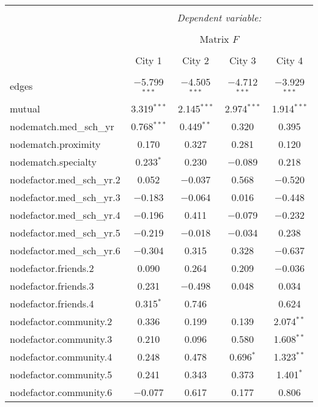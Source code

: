 \documentclass[11pt]{article}
\begin{document}
\begin{table}[!htbp] \centering 
  \caption{} 
  \label{} 
\begin{tabular}{@{\extracolsep{5pt}}lcccc} 
\\[-1.8ex]\hline 
\hline \\[-1.8ex] 
 & \multicolumn{4}{c}{\textit{Dependent variable:}} \\ 
\cline{2-5} 
\\[-1.8ex] & \multicolumn{4}{c}{Matrix $F$} \\ 
\\[-1.8ex] & City 1 & City 2 & City 3 & City 4\\ 
\hline \\[-1.8ex] 
 edges & $-$5.799$^{***}$ & $-$4.505$^{***}$ & $-$4.712$^{***}$ & $-$3.929$^{***}$ \\ 
  mutual & 3.319$^{***}$ & 2.145$^{***}$ & 2.974$^{***}$ & 1.914$^{***}$ \\ 
  nodematch.med\_sch\_yr & 0.768$^{***}$ & 0.449$^{**}$ & 0.320 & 0.395 \\ 
  nodematch.proximity & 0.170 & 0.327 & 0.281 & 0.120 \\ 
  nodematch.specialty & 0.233$^{*}$ & 0.230 & $-$0.089 & 0.218 \\ 
  nodefactor.med\_sch\_yr.2 & 0.052 & $-$0.037 & 0.568 & $-$0.520 \\ 
  nodefactor.med\_sch\_yr.3 & $-$0.183 & $-$0.064 & 0.016 & $-$0.448 \\ 
  nodefactor.med\_sch\_yr.4 & $-$0.196 & 0.411 & $-$0.079 & $-$0.232 \\ 
  nodefactor.med\_sch\_yr.5 & $-$0.219 & $-$0.018 & $-$0.034 & 0.238 \\ 
  nodefactor.med\_sch\_yr.6 & $-$0.304 & 0.315 & 0.328 & $-$0.637 \\ 
  nodefactor.friends.2 & 0.090 & 0.264 & 0.209 & $-$0.036 \\ 
  nodefactor.friends.3 & 0.231 & $-$0.498 & 0.048 & 0.034 \\ 
  nodefactor.friends.4 & 0.315$^{*}$ & 0.746 &  & 0.624 \\ 
  nodefactor.community.2 & 0.336 & 0.199 & 0.139 & 2.074$^{**}$ \\ 
  nodefactor.community.3 & 0.210 & 0.096 & 0.580 & 1.608$^{**}$ \\ 
  nodefactor.community.4 & 0.248 & 0.478 & 0.696$^{*}$ & 1.323$^{**}$ \\ 
  nodefactor.community.5 & 0.241 & 0.343 & 0.373 & 1.401$^{*}$ \\ 
  nodefactor.community.6 & $-$0.077 & 0.617 & 0.177 & 0.806 \\ 

\end{tabular}
\end{table}
\end{document}
